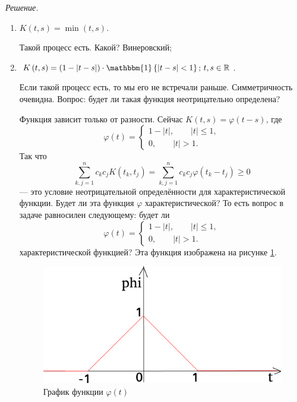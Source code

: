 \textit{Решение.}
\begin{enumerate}[label=\alph*)]
  \item $K \left( t, s \right) = \min \left( t, s \right) $.

  Такой процесс есть.
  Какой?
  Винеровский;
  \item $K \left( t, s \right) =
    \left( 1 - \left| t - s \right| \right) \cdot
    \mathbbm{1} \left\{ \left| t - s \right| < 1 \right\}; \,
    t, s \in \mathbb{R}$.

  Если такой процесс есть, то мы его не встречали раньше.
  Симметричность очевидна.
  Вопрос: будет ли такая функция неотрицательно определена?

  Функция зависит только от разности.
  Сейчас $K \left( t, s \right) = \varphi \left( t - s \right) $, где
  $$ \varphi \left( t \right) =
    \begin{cases}
      1 - \left| t \right| , \qquad \left| t \right| \leq 1, \\
      0, \qquad \left| t \right| > 1.
    \end{cases}$$
  Так что
  $$ \sum \limits_{k, j = 1}^n c_k c_j K \left( t_k, t_j \right) =
    \sum \limits_{k, j = 1}^n c_k c_j \varphi \left( t_k - t_j \right) \geq
    0$$
  --- это условие неотрицательной определённости для характеристической функции.
  Будет ли эта функция $ \varphi $ характеристической?
  То есть вопрос в задаче равносилен следующему: будет ли
  $$ \varphi \left( t \right) =
    \begin{cases}
      1 - \left| t \right| , \qquad \left| t \right| \leq 1, \\
      0, \qquad \left| t \right| > 1.
    \end{cases}$$
  характеристической функцией?
  Эта функция изображена на рисунке \ref{fig:42}.

  \begin{figure}[h!]
    \centering
    \includegraphics[width=.4\textwidth]{./pictures/4_2.png}
    \caption{График функции $ \varphi \left( t \right) $}
    \label{fig:42}
  \end{figure}



\end{enumerate}
